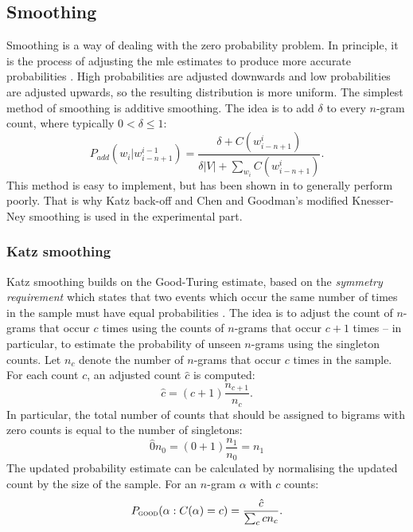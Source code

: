 	\subsection{Smoothing}
	\label{subsection:smoothing}
	Smoothing is a way of dealing with the zero probability problem. In principle, it is the process of adjusting the \gls{mle} estimates to produce more accurate probabilities \cite{chen1996empirical}. High probabilities are adjusted downwards and low probabilities are adjusted upwards, so the resulting distribution is more uniform. The simplest method of smoothing is additive smoothing. The idea is to add $\delta$ to every \mbox{$n$-gram} count, where typically $0 < \delta \leq 1$:
	\begin{equation}
		P_{add}(w_{i}|w_{i-n+1}^{i-1})=\frac{\delta+C(w_{i-n+1}^{i})}{\delta|V|+\sum_{w_{i}}C(w_{i-n+1}^{i})}.
	\end{equation}
	This method is easy to implement, but has been shown in \cite{Gale94what'swrong} to generally perform poorly. That is why Katz back-off and Chen and Goodman's modified Knesser-Ney smoothing is used in the experimental part.
	\subsubsection*{Katz smoothing}
	Katz smoothing builds on the Good-Turing estimate, based on the \textit{symmetry requirement} which states that two events which occur the same number of times in the sample must have equal probabilities \cite{whittaker2000statistical}. The idea is to adjust the count of \mbox{$n$-gram}s that occur $c$ times using the counts of \mbox{$n$-gram}s that occur $c+1$ times -- in particular, to estimate the probability of unseen \mbox{$n$-gram}s using the singleton counts. Let $n_{c}$ denote the number of \mbox{$n$-gram}s that occur $c$ times in the sample. For each count $c$, an adjusted count $\hat{c}$ is computed:
	\begin{equation}
		\hat{c}=(c+1)\frac{n_{c+1}}{n_{c}}.
	\end{equation}
	In particular, the total number of counts that should be assigned to bigrams with zero counts is equal to the number of singletons:
	\begin{equation}
		\label{equation:good-turing}
		\hat{0}n_{0}=(0+1)\frac{n_{1}}{n_{0}}=n_{1}
	\end{equation}
	The updated probability estimate can be calculated by normalising the updated count by the size of the sample. For an \mbox{$n$-gram} $\alpha$ with $c$ counts:
	\begin{equation}
		P_{\textsc{good}}(\alpha:C(\alpha)=c)=\frac{\hat{c}}{\sum_{c}cn_{c}}.
	\end{equation}

